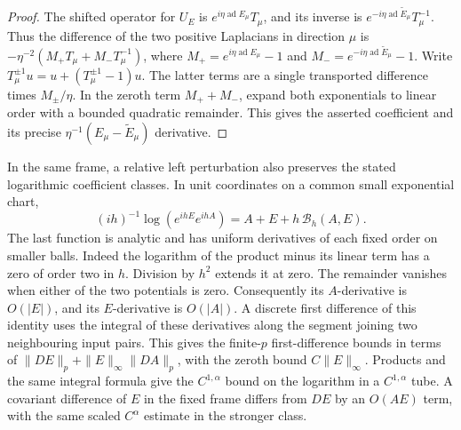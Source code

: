 \documentclass[11pt,letterpaper,reqno]{amsart}
\numberwithin{equation}{section}
\theoremstyle{definition}
\theoremstyle{remark}
\begin{document}
\begin{proof}
The shifted operator for \(U_E\) is \(e^{i\eta\operatorname{ad}E_\mu}T_\mu\),
and its inverse is \(e^{-i\eta\operatorname{ad}\widetilde E_\mu}T_\mu^{-1}\).
Thus the difference of the two positive Laplacians in direction
\(\mu\) is \(-\eta^{-2}(M_+T_\mu+M_-T_\mu^{-1})\), where
\(M_+=e^{i\eta\operatorname{ad}E_\mu}-1\) and
\(M_-=e^{-i\eta\operatorname{ad}\widetilde E_\mu}-1\).
Write \(T_\mu^{\pm1}u=u+(T_\mu^{\pm1}-1)u\).
The latter terms are a single transported difference times
\(M_\pm/\eta\). In the zeroth term \(M_++M_-\), expand both
exponentials to linear order with a bounded quadratic remainder.
This gives the asserted coefficient and its precise
\(\eta^{-1}(E_\mu-\widetilde E_\mu)\) derivative.
\end{proof}

In the same frame, a relative left perturbation also preserves
the stated logarithmic coefficient classes. In unit coordinates
on a common small exponential chart,
\[
 (ih)^{-1}\log(e^{ihE}e^{ihA})=A+E+h\,\mathcal B_h(A,E).
\]
The last function is analytic and has uniform derivatives of
each fixed order on smaller balls. Indeed the logarithm of
the product minus its linear term has a zero of order two
in \(h\). Division by \(h^2\) extends it at zero. The
remainder vanishes when either of the two potentials is zero.
Consequently its \(A\)-derivative is \(O(|E|)\), and its
\(E\)-derivative is \(O(|A|)\). A discrete first difference of
this identity uses the integral of these derivatives along
the segment joining two neighbouring input pairs. This gives
the finite-\(p\) first-difference bounds in terms of
\(\|DE\|_p+\|E\|_\infty\|DA\|_p\), with the zeroth bound
\(C\|E\|_\infty\). Products and the same integral formula
give the \(C^{1,\alpha}\) bound on the logarithm in a
\(C^{1,\alpha}\) tube. A covariant difference of \(E\)
in the fixed frame differs from \(DE\) by an \(O(AE)\)
term, with the same scaled \(C^\alpha\) estimate in
the stronger class.
\end{document}
